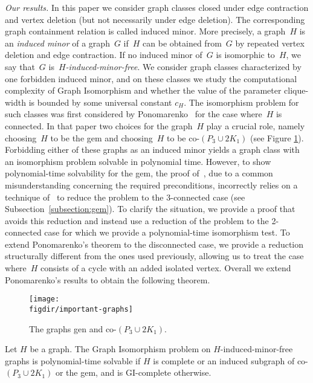 \documentclass[envcountsame,envcountsect,11pt,a4paper]{llncs}
\newcommand{\figdir}{.}
\begin{document}
{\it Our results.} In this paper we consider graph classes closed under edge contraction and vertex deletion (but not necessarily under edge
deletion). The corresponding graph containment relation is called induced minor. More precisely, a graph~$H$ is an \emph{induced minor} of a
graph~$G$ if~$H$ can be obtained from~$G$ by repeated vertex deletion and edge contraction. If no induced minor of~$G$ is isomorphic to~$H$,
we say that~$G$ is~\emph{$H$-induced-minor-free}. We consider graph classes characterized by one forbidden induced minor, and on these classes we
study the computational complexity of {\sc Graph Isomorphism} and whether the value of the parameter clique-width is bounded by
some universal constant $c_H$. The isomorphism problem for such classes was first considered by Ponomarenko~\cite{Ponomarenko88} for the
case where~$H$ is connected. In that paper two choices for the graph~$H$ play a crucial role, namely choosing~$H$ to be the gem and
choosing~$H$ to be co-$(P_{3} \cup 2 K_{1})$ (see Figure \ref{fig:important-graphs}).
Forbidding either of these graphs as an induced minor yields a graph class with an isomorphism problem solvable in polynomial time.
However, to show polynomial-time solvability for the gem, the proof of~\cite{Ponomarenko88}, due to a common misunderstanding concerning the
required preconditions, incorrectly relies on a technique of~\cite{DBLP:conf/coco/HopcroftT72} to reduce the problem to the 3-connected case
(see Subsection~\ref{subsection:gem}). To clarify the situation, we provide a proof that avoids this reduction and instead use a reduction
of the problem to the 2-connected case for which we provide a polynomial-time isomorphism test.
To extend Ponomarenko's theorem to the disconnected case, we provide a reduction structurally different from the ones used previously,
allowing us to treat the case where~$H$ consists of a cycle with an added isolated vertex.
Overall we extend Ponomarenko's results to obtain the following theorem.
\begin{figure}[htb]
  \centering
  \texttt{[image: \\figdir/important-graphs]}
  \caption{The graphs gen and co-$(P_{3} \cup 2 K_{1})$.}
  \label{fig:important-graphs}
\end{figure}

\begin{theorem}
Let $H$ be a graph. The {\sc Graph Isomorphism} problem on $H$-induced-minor-free graphs is polynomial-time solvable if $H$ is complete or
an induced subgraph of co-$(P_{3} \cup 2 K_{1})$ or the gem, and is GI-complete otherwise.
\end{theorem}
\end{document}

